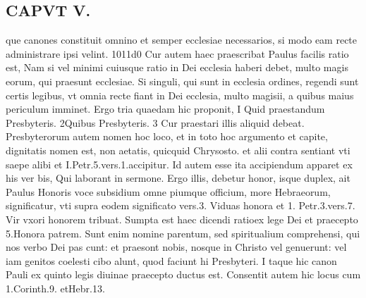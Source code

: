 \documentclass{article}
\begin{document}
\begin{pages}
\section*{CAPVT  V. }\pstart que canones constituit omnino et semper ecclesiae necessarios, si modo eam recte administrare ipsi velint. 1011d0 Cur autem haec praescribat Paulus facilis ratio est, Nam si vel minimi cuiusque ratio in Dei ecclesia haberi debet, multo magis eorum, qui praesunt ecclesiae. Si singuli, qui sunt in ecclesia ordines, regendi sunt certis legibus, vt omnia recte fiant in Dei ecclesia, multo magisii, a quibus maius periculum imminet. Ergo tria quaedam hic proponit, I Quid praestandum Presbyteris. 2Quibus Presbyteris. 3 Cur praestari illis aliquid debeat. Presbyterorum autem nomen hoc loco, et in toto hoc argumento et capite, dignitatis nomen est, non aetatis, quicquid Chrysosto. et alii contra sentiant vti saepe alibi et I.Petr.5.vers.1.accipitur. Id autem esse ita accipiendum apparet ex his ver bis, Qui laborant in sermone. Ergo illis, debetur honor, isque duplex, ait Paulus Honoris voce subsidium omne piumque officium, more Hebraeorum, significatur, vti supra eodem significato vers.3. Viduas honora et 1. Petr.3.vers.7. Vir vxori honorem tribuat. Sumpta est haec dicendi ratioex lege Dei et praecepto 5.Honora patrem. Sunt enim nomine parentum, sed spiritualium comprehensi, qui nos verbo Dei pas cunt: et praesont nobis, nosque in Christo vel genuerunt: vel iam genitos coelesti cibo alunt, quod faciunt hi Presbyteri. I taque hic canon Pauli ex quinto legis diuinae praecepto ductus est. Consentit autem hic locus cum 1.Corinth.9. etHebr.13.  \pend

\end{pages}
\end{document}
